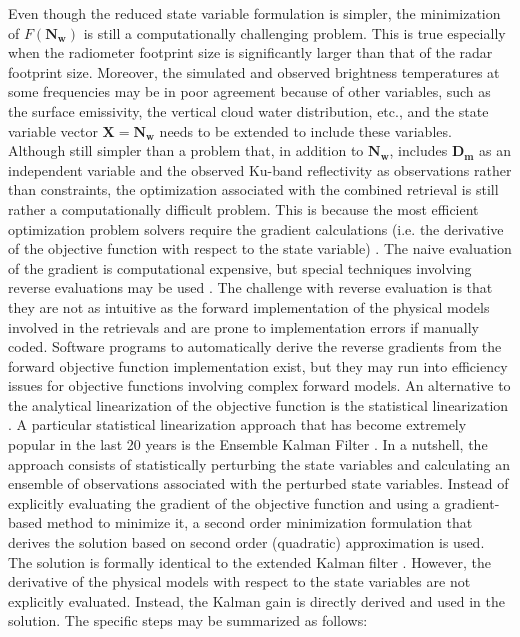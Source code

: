 \documentclass[10pt]{ietbook}
\begin{document}
Even though the reduced state variable formulation is simpler, the minimization of $F(\mathbf{N_w})$ is still a computationally challenging problem. This is
true especially when the radiometer footprint size is significantly larger than that of the radar footprint size. Moreover, the simulated and observed
brightness temperatures at some frequencies may be in poor agreement because of other variables, such as the surface emissivity, the vertical cloud water
distribution, etc., and the state variable vector $\mathbf{X={N_w}}$ needs to be extended to include these variables.  Although still simpler than a
problem that, in addition to $\mathbf{N_w}$, includes $\mathbf{D_m}$ as an independent variable and the observed Ku-band reflectivity as observations rather than constraints,
the optimization associated with the combined retrieval is still rather a computationally difficult problem.  This is because the most efficient optimization
problem solvers require the gradient calculations (i.e. the derivative of the objective function with respect to the state variable) \cite{bertsekas2016}.
The naive evaluation of the gradient is computational expensive, but special techniques involving reverse evaluations may be used \cite{grecu2002}.
The challenge with reverse evaluation is that they are not as intuitive as the forward implementation of the physical models involved in the retrievals
and are prone to implementation errors if manually coded.  Software programs to automatically derive the reverse gradients from the forward objective 
function implementation \cite{grecu2002} exist, but they may run into efficiency issues for objective functions involving complex forward models. An alternative
to the analytical linearization of the objective function is the statistical linearization \cite{gelb1974}. A particular statistical linearization 
approach  that has become extremely popular in the last 20 years is the Ensemble Kalman Filter \cite{evensen2009}. In a nutshell, the approach consists
of statistically perturbing the state variables and calculating an ensemble of observations associated with the perturbed state variables.  Instead of
explicitly evaluating the gradient of the objective function and using a gradient-based method to minimize it, a second order minimization formulation
that derives the solution based on second order (quadratic) approximation is used.  The solution is formally identical to the extended 
Kalman filter \cite{evensen2009}. However, the derivative of the physical models with respect to the state variables are not explicitly evaluated.
Instead, the Kalman gain \cite{evensen2009} is directly derived and used in the solution. The specific steps may be summarized as follows:
\end{document}
